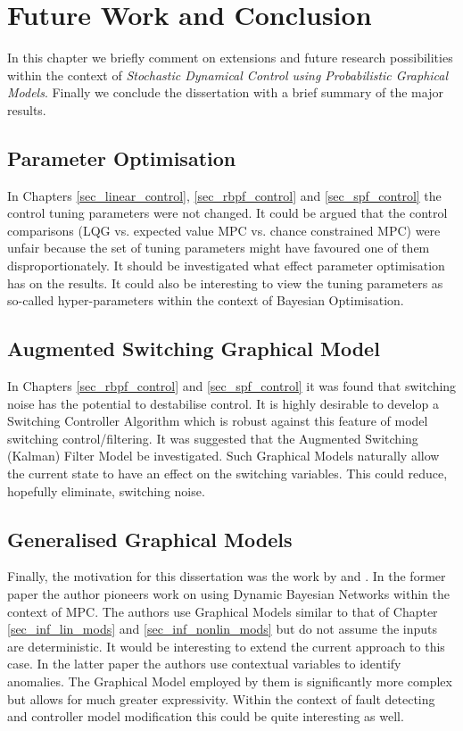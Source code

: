 \chapter{Future Work and Conclusion}
In this chapter we briefly comment on extensions and future research possibilities within the context of \textit{Stochastic Dynamical Control using Probabilistic Graphical Models}. Finally we conclude the dissertation with a brief summary of the major results.

\section{Parameter Optimisation}
In Chapters \ref{sec_linear_control}, \ref{sec_rbpf_control} and \ref{sec_spf_control} the control tuning parameters were not changed. It could be argued that the control comparisons (LQG vs. expected value MPC vs. chance constrained MPC) were unfair because the set of tuning parameters might have favoured one of them disproportionately. It should be investigated what effect parameter optimisation has on the results. It could also be interesting to view the tuning parameters as so-called hyper-parameters within the context of Bayesian Optimisation. 

\section{Augmented Switching Graphical Model}
In Chapters \ref{sec_rbpf_control} and \ref{sec_spf_control} it was found that switching noise has the potential to destabilise control. It is highly desirable to develop a Switching Controller Algorithm which is robust against this feature of model switching control/filtering. It was suggested that the Augmented Switching (Kalman) Filter Model be investigated. Such Graphical Models naturally allow the current state to have an effect on the switching variables. This could reduce, hopefully eliminate, switching noise. 

\section{Generalised Graphical Models}
Finally, the motivation for this dissertation was the work by \cite{devilliers} and \cite{dabrowski}. In the former paper the author pioneers work on using Dynamic Bayesian Networks within the context of MPC. The authors use Graphical Models similar to that of Chapter \ref{sec_inf_lin_mods} and \ref{sec_inf_nonlin_mods} but do not assume the inputs are deterministic. It would be interesting to extend the current approach to this case. In the latter paper the authors use contextual variables to identify anomalies. The Graphical Model employed by them is significantly more complex but allows for much greater expressivity. Within the context of fault detecting and controller model modification this could be quite interesting as well.


